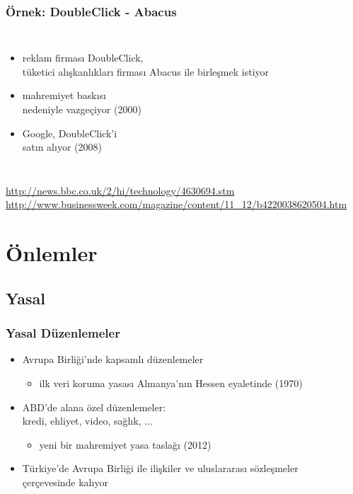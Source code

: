 \documentclass[dvipsnames]{beamer}
\theoremstyle{definition}
\theoremstyle{example}
\theoremstyle{plain}
\begin{document}
\begin{frame}
  \frametitle{Örnek: DoubleClick - Abacus}

  \begin{columns}

    \begin{itemize}
      \item reklam firması DoubleClick,\\
        tüketici alışkanlıkları firması Abacus
        ile birleşmek istiyor\\
      \item mahremiyet baskısı\\
        nedeniyle vazgeçiyor (2000)

      \pause
      \medskip
      \item Google, DoubleClick'i\\
        satın alıyor (2008)
    \end{itemize}
  \end{columns}

  \medskip
  \tiny{\url{http://news.bbc.co.uk/2/hi/technology/4630694.stm}}\\
  \tiny{\url{http://www.businessweek.com/magazine/content/11_12/b4220038620504.htm}}\\
\end{frame}

\section{Önlemler}

\subsection{Yasal}

\begin{frame}
  \frametitle{Yasal Düzenlemeler}

  \begin{itemize}
    \item Avrupa Birliği'nde kapsamlı düzenlemeler
    \begin{itemize}
      \item ilk veri koruma yasası Almanya'nın Hessen eyaletinde (1970)
    \end{itemize}

    \pause
    \item ABD'de alana özel düzenlemeler:\\
      kredi, ehliyet, video, sağlık, ...
    \begin{itemize}
      \item yeni bir mahremiyet yasa taslağı (2012)
    \end{itemize}

    \pause
    \item Türkiye'de Avrupa Birliği ile ilişkiler ve uluslararası sözleşmeler\\
      çerçevesinde kalıyor
  \end{itemize}
\end{frame}
\end{document}
